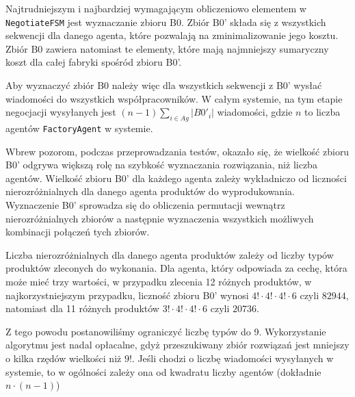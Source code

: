 Najtrudniejszym i najbardziej wymagającym obliczeniowo elementem w \texttt{NegotiateFSM} jest wyznaczanie zbioru B0. Zbiór B0' składa się z wszystkich sekwencji dla danego agenta, które pozwalają na zminimalizowanie jego kosztu. Zbiór B0 zawiera natomiast te elementy, które mają najmniejszy sumaryczny koszt dla całej fabryki spośród zbioru B0'.

Aby wyznaczyć zbiór B0 należy więc dla wszystkich sekwencji z B0' wysłać wiadomości do wszystkich współpracowników. W całym systemie, na tym etapie negocjacji wysyłanych jest $(n-1)\sum_{i \in Ag}|B0'_i|$ wiadomości, gdzie $n$ to liczba agentów \texttt{FactoryAgent} w systemie. 

Wbrew pozorom, podczas przeprowadzania testów, okazało się, że wielkość zbioru B0' odgrywa większą rolę na szybkość wyznaczania rozwiązania, niż liczba agentów. Wielkość zbioru B0' dla każdego agenta zależy wykładniczo od liczności nierozróżnialnych dla danego agenta produktów do wyprodukowania. Wyznaczenie B0' sprowadza się do obliczenia permutacji wewnątrz nierozróżnialnych zbiorów a następnie wyznaczenia wszystkich możliwych kombinacji połączeń tych zbiorów. 

Liczba nierozróżnialnych dla danego agenta produktów zależy od liczby typów produktów zleconych do wykonania. Dla agenta, który odpowiada za cechę, która może mieć trzy wartości, w przypadku zlecenia 12 różnych produktów, w najkorzystniejszym przypadku, liczność zbioru B0' wynosi $4!\cdot 4!\cdot 4!\cdot 6$ czyli $\num{82944}$, natomiast dla 11 różnych produktów $3!\cdot 4!\cdot 4!\cdot 6$ czyli $\num{20736}$.

Z tego powodu postanowiliśmy ograniczyć liczbę typów do 9. Wykorzystanie algorytmu jest nadal opłacalne, gdyż przeszukiwany zbiór rozwiązań jest mniejszy o kilka rzędów wielkości niż $9!$. Jeśli chodzi o liczbę wiadomości wysyłanych w systemie, to w ogólności zależy ona od kwadratu liczby agentów (dokładnie $n \cdot (n-1)$)

